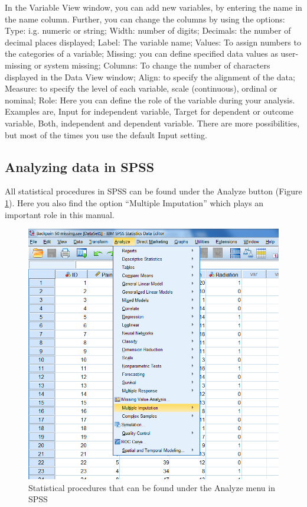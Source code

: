 \documentclass[]{book}
\theoremstyle{definition}
\theoremstyle{definition}
\theoremstyle{definition}
\theoremstyle{remark}
\begin{document}
In the Variable View window, you can add new variables, by entering the
name in the name column. Further, you can change the columns by using
the options: Type: i.g. numeric or string; Width: number of digits;
Decimals: the number of decimal places displayed; Label: The variable
name; Values: To assign numbers to the categories of a variable;
Missing: you can define specified data values as user-missing or system
missing; Columns: To change the number of characters displayed in the
Data View window; Align: to specify the alignment of the data; Measure:
to specify the level of each variable, scale (continuous), ordinal or
nominal; Role: Here you can define the role of the variable during your
analysis. Examples are, Input for independent variable, Target for
dependent or outcome variable, Both, independent and dependent variable.
There are more possibilities, but most of the times you use the default
Input setting.

\subsection{Analyzing data in SPSS}\label{analyzing-data-in-spss}

All statistical procedures in SPSS can be found under the Analyze button
(Figure \ref{fig:fig4}). Here you also find the option ``Multiple
Imputation'' which plays an important role in this manual.

\begin{figure}

{\centering \includegraphics[width=0.8\linewidth]{images/fig1.4} 

}

\caption{Statistical procedures that can be found under the Analyze menu in SPSS}\label{fig:fig4}
\end{figure}
\end{document}
